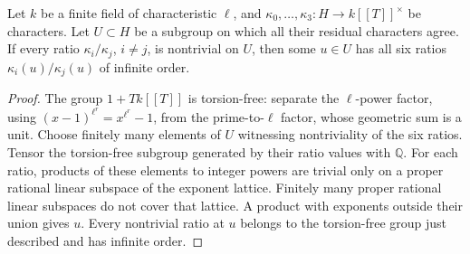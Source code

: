 \begin{srlemma}
\label{lem:sr-four-free-local-element}
Let \(k\) be a finite field of characteristic \(\ell\), and
\(\kappa_0,\ldots,\kappa_3:H\to k[[T]]^\times\) be characters.
Let \(U\subset H\) be a subgroup on which all their residual
characters agree.
If every ratio \(\kappa_i/\kappa_j\), \(i\ne j\), is nontrivial
on \(U\), then some \(u\in U\) has all six ratios
\(\kappa_i(u)/\kappa_j(u)\) of infinite order.
\end{srlemma}
\begin{proof}
The group \(1+Tk[[T]]\) is torsion-free:
separate the \(\ell\)-power factor, using
\((x-1)^{\ell^r}=x^{\ell^r}-1\), from the prime-to-\(\ell\)
factor, whose geometric sum is a unit.
Choose finitely many elements of \(U\) witnessing nontriviality
of the six ratios.
Tensor the torsion-free subgroup generated by their ratio
values with \(\mathbb Q\).
For each ratio, products of these elements to integer powers
are trivial only on a proper rational linear subspace of the
exponent lattice. Finitely many proper rational linear
subspaces do not cover that lattice.
A product with exponents outside their union gives \(u\).
Every nontrivial ratio at \(u\) belongs to the torsion-free
group just described and has infinite order.
\end{proof}

